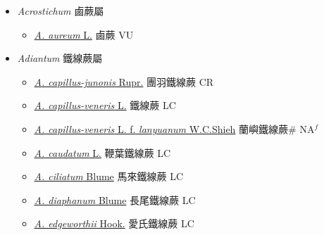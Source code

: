 
  \begin{itemize}
 \item[] \textit{Acrostichum} 鹵蕨屬
                    
  \begin{itemize}
        \item[] \href{http://www.theplantlist.org/tpl1.1/search?q=Acrostichum+aureum}{\textit{A. aureum} L.}   鹵蕨 VU
  \end{itemize}
 \item[] \textit{Adiantum} 鐵線蕨屬
                    
  \begin{itemize}
        \item[] \href{http://www.theplantlist.org/tpl1.1/search?q=Adiantum+capillus-junonis}{\textit{A. capillus-junonis} Rupr.}   團羽鐵線蕨 CR
        \item[] \href{http://www.theplantlist.org/tpl1.1/search?q=Adiantum+capillus-veneris}{\textit{A. capillus-veneris} L.}   鐵線蕨 LC
        \item[] \href{http://www.theplantlist.org/tpl1.1/search?q=Adiantum+capillus-veneris+ f. +lanyuanum}{\textit{A. capillus-veneris} L.  f.  \textit{lanyuanum} W.C.Shieh}   蘭嶼鐵線蕨\# NA$^f$
        \item[] \href{http://www.theplantlist.org/tpl1.1/search?q=Adiantum+caudatum}{\textit{A. caudatum} L.}   鞭葉鐵線蕨 LC
        \item[] \href{http://www.theplantlist.org/tpl1.1/search?q=Adiantum+ciliatum}{\textit{A. ciliatum} Blume}     馬來鐵線蕨 LC
        \item[] \href{http://www.theplantlist.org/tpl1.1/search?q=Adiantum+diaphanum}{\textit{A. diaphanum} Blume}   長尾鐵線蕨 LC
        \item[] \href{http://www.theplantlist.org/tpl1.1/search?q=Adiantum+edgeworthii}{\textit{A. edgeworthii} Hook.}   愛氏鐵線蕨 LC

\end{itemize}
\end{itemize}
